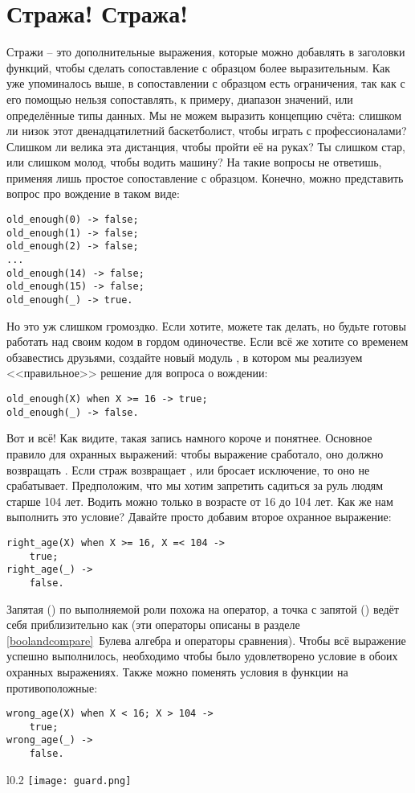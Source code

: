 \section{Стража! Стража!}
    Стражи \--- это дополнительные выражения, которые можно добавлять в заголовки функций, чтобы сделать сопоставление с образцом более выразительным. Как уже упоминалось выше, в сопоставлении с образцом есть ограничения, так как с его помощью нельзя сопоставлять, к примеру, диапазон значений, или  определённые типы данных. Мы не можем выразить концепцию счёта: слишком ли низок этот двенадцатилетний баскетболист, чтобы играть с профессионалами? Слишком ли велика эта дистанция, чтобы пройти её на руках? Ты слишком стар, или слишком молод, чтобы водить машину? На такие вопросы не ответишь, применяя лишь простое сопоставление с образцом. Конечно, можно представить вопрос про вождение в таком виде:
\begin{lstlisting}[style=erlang]
old_enough(0) -> false;
old_enough(1) -> false;
old_enough(2) -> false;
...
old_enough(14) -> false;
old_enough(15) -> false;
old_enough(_) -> true.
\end{lstlisting}

Но это уж слишком громоздко. Если хотите, можете так делать, но будьте готовы работать над своим кодом в гордом одиночестве. Если всё же хотите со временем обзавестись друзьями, создайте новый модуль , в котором мы реализуем <<правильное>> решение для вопроса о вождении:
\begin{lstlisting}[style=erlang]
old_enough(X) when X >= 16 -> true;
old_enough(_) -> false.
\end{lstlisting}

Вот и всё! Как видите, такая запись намного короче и понятнее. Основное правило для охранных выражений: чтобы выражение сработало, оно должно возвращать . Если страж возвращает , или бросает исключение, то оно не срабатывает. Предположим, что мы хотим запретить садиться за руль людям старше 104 лет. Водить можно только в возрасте от 16 до 104 лет. Как же нам выполнить это условие? Давайте просто добавим второе охранное выражение:
\begin{lstlisting}[style=erlang]
right_age(X) when X >= 16, X =< 104 ->
    true;
right_age(_) ->
    false.
\end{lstlisting}

Запятая (\ops{\strut,}) по выполняемой роли похожа на оператор, а точка с запятой (\ops{;}) ведёт себя приблизительно как (эти операторы описаны в разделе \ref{boolandcompare}~Булева алгебра и операторы сравнения). Чтобы всё выражение успешно выполнилось, необходимо чтобы было удовлетворено условие в обоих охранных выражениях. Также можно поменять условия в функции на противоположные:
\begin{lstlisting}[style=erlang]
wrong_age(X) when X < 16; X > 104 ->
    true;
wrong_age(_) ->
    false.
\end{lstlisting}
\begin{wrapfigure}{l}{0.2\linewidth}
    \texttt{[image: guard.png]}
\end{wrapfigure}

